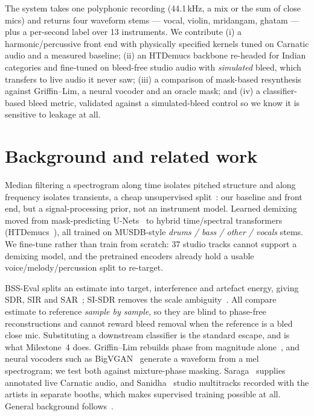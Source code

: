 \documentclass[11pt,a4paper,twocolumn]{article}
\begin{document}
The system takes one polyphonic recording (44.1\,kHz, a mix or the sum of close mics) and
returns four waveform stems --- vocal, violin, mridangam, ghatam --- plus a per-second label
over 13 instruments. We contribute (i) a harmonic/percussive front end with physically
specified kernels tuned on Carnatic audio and a measured baseline; (ii) an HTDemucs backbone
re-headed for Indian categories and fine-tuned on bleed-free studio audio with \emph{simulated}
bleed, which transfers to live audio it never saw; (iii) a comparison of mask-based resynthesis
against Griffin--Lim, a neural vocoder and an oracle mask; and (iv) a classifier-based bleed
metric, validated against a simulated-bleed control so we know it is sensitive to leakage at
all.

\section{Background and related work}
Median filtering a spectrogram along time isolates pitched structure and along frequency
isolates transients, a cheap unsupervised split~\cite{fitzgerald2010hpss}: our baseline and
front end, but a signal-processing prior, not an instrument model. Learned demixing moved from
mask-predicting U-Nets~\cite{hennequin2020spleeter} to hybrid time/spectral transformers
(HTDemucs~\cite{rouard2023htdemucs}), all trained on MUSDB-style \emph{drums / bass / other /
vocals} stems. We fine-tune rather than train from scratch: 37 studio tracks cannot support a
demixing model, and the pretrained encoders already hold a usable voice/melody/percussion split
to re-target.

BSS-Eval splits an estimate into target, interference and artefact energy, giving SDR, SIR and
SAR~\cite{vincent2006bss}; SI-SDR removes the scale ambiguity~\cite{leroux2019sisdr}. All
compare estimate to reference \emph{sample by sample}, so they are blind to phase-free
reconstructions and cannot reward bleed removal when the reference is a bled close mic.
Substituting a downstream classifier is the standard escape, and is what Milestone~4 does.
Griffin--Lim rebuilds phase from magnitude alone~\cite{griffin1984}, and neural vocoders such as
BigVGAN~\cite{lee2023bigvgan} generate a waveform from a mel spectrogram; we test both against
mixture-phase masking. Saraga~\cite{srinivasamurthy2021saraga} supplies annotated live Carnatic
audio, and Sanidha~\cite{sanidha2025} studio multitracks recorded with the artists in separate
booths, which makes supervised training possible at all. General background
follows~\cite{russell2021aima}.
\end{document}
